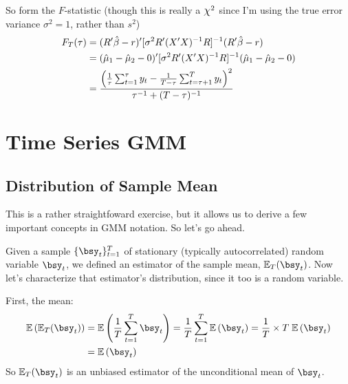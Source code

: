 \documentclass[12pt]{article}
\theoremstyle{plain}
\theoremstyle{definition}
\theoremstyle{remark}
\newcommand*{\Chi}{\mbox{\large$\chi$}} %
\begin{document}
So form the $F$-statistic (though this is really a $\Chi^2$ since I'm
using the true error variance $\sigma^2=1$, rather than $s^2$)
\begin{align*}
  F_T(\tau)
  &=
  (R'\hat{\beta}-r)'
  [\sigma^2 R'(X'X)^{-1}R]^{-1}
  (R'\hat{\beta}-r)
  \\
  &=
  (\hat{\mu}_1-\hat{\mu}_2-0)'
  [\sigma^2 R'(X'X)^{-1}R]^{-1}
  (\hat{\mu}_1-\hat{\mu}_2-0)
  \\
  &=
  \frac{%
  \left(
  \frac{1}{\tau}\sum_{t=1}^\tau y_t
  -
  \frac{1}{T-\tau}\sum_{t=\tau+1}^T y_t
  \right)^2
  }{\tau^{-1} + (T-\tau)^{-1}}
\end{align*}



\clearpage
\section{Time Series GMM}

\subsection{Distribution of Sample Mean}
\label{sec:mean}

This is a rather straightfoward exercise, but it allows us to derive a
few important concepts in GMM notation. So let's go ahead.

Given a sample $\{\bsy_t\}^T_{t=1}$ of stationary (typically
autocorrelated) random variable $\bsy_t$, we defined an
estimator of the sample mean, $\mathbb{E}_T(\bsy_t)$. Now
let's characterize that estimator's distribution, since it too is a
random variable.

First, the mean:
\begin{align*}
  \mathbb{E}\left(\mathbb{E}_T(\bsy_t)\right)
  &= \mathbb{E}\left(\frac{1}{T}\sum^T_{t=1} \bsy_t\right)
  = \frac{1}{T}\sum^T_{t=1} \mathbb{E}\left(\bsy_t\right)
  = \frac{1}{T} \times T \; \mathbb{E}\left(\bsy_t\right)\\
  &= \mathbb{E}\left(\bsy_t\right)
\end{align*}
So $\mathbb{E}_T(\bsy_t)$ is an unbiased estimator of the
unconditional mean of $\bsy_t$.
\end{document}
